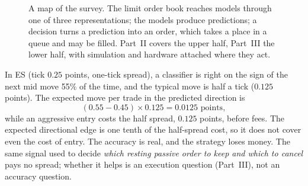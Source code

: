 \begin{figure}[!htbp]
\caption{A map of the survey. The limit order book reaches models through one of three representations; the models
produce predictions; a decision turns a prediction into an order, which takes a place in a queue and may be filled.
Part~II covers the upper half, Part~III the lower half, with simulation and hardware attached where they act.}
\label{fig:survey-map}
\end{figure}

\begin{example}
\label{ex:untradeable}
In ES (tick $0.25$ points, one-tick spread), a classifier is right on the sign of the next mid
move 55\% of the time, and the typical move is half a tick ($0.125$ points). The expected move per
trade in the predicted direction is
\[
  (0.55 - 0.45)\times 0.125 = 0.0125 \text{ points},
\]
while an aggressive entry costs the half spread, $0.125$ points, before fees. The expected directional edge is
one tenth of the half-spread cost, so it does not cover even the cost of entry. The accuracy is real, and the strategy loses money. The same signal used to decide
\emph{which resting passive order to keep and which to cancel} pays no spread; whether it helps is
an execution question (Part~III), not an accuracy question.
\end{example}

